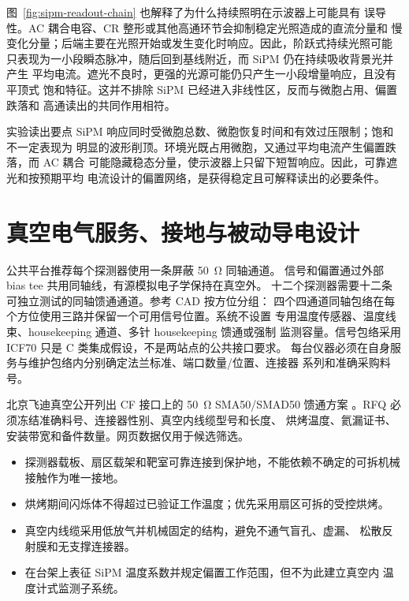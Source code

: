 \documentclass[UTF8,10pt,letterpaper,fontset=none]{ctexart}
\begin{document}
图~\ref{fig:sipm-readout-chain} 也解释了为什么持续照明在示波器上可能具有
误导性。AC 耦合电容、CR 整形或其他高通环节会抑制稳定光照造成的直流分量和
慢变化分量；后端主要在光照开始或发生变化时响应。因此，阶跃式持续光照可能
只表现为一小段瞬态脉冲，随后回到基线附近，而 SiPM 仍在持续吸收背景光并产生
平均电流。遮光不良时，更强的光源可能仍只产生一小段增量响应，且没有平顶式
饱和特征。这并不排除 SiPM 已经进入非线性区，反而与微胞占用、偏置跌落和
高通读出的共同作用相符。

\begin{notebox}{实验读出要点}
  SiPM 响应同时受微胞总数、微胞恢复时间和有效过压限制；饱和不一定表现为
  明显的波形削顶。环境光既占用微胞，又通过平均电流产生偏置跌落，而 AC 耦合
  可能隐藏稳态分量，使示波器上只留下短暂响应。因此，可靠遮光和按预期平均
  电流设计的偏置网络，是获得稳定且可解释读出的必要条件。
\end{notebox}

\section{真空电气服务、接地与被动导电设计}

公共平台推荐每个探测器使用一条屏蔽 \SI{50}{\ohm} 同轴通道。
信号和偏置通过外部 bias tee 共用同轴线，有源模拟电子学保持在真空外。
十二个探测器需要十二条可独立测试的同轴馈通通道。参考 CAD 按方位分组：
四个四通道同轴包络在每个方位使用三路并保留一个可用信号位置。系统不设置
专用温度传感器、温度线束、housekeeping 通道、多针 housekeeping 馈通或强制
监测容量。信号包络采用 ICF70 只是 C 类集成假设，不是两站点的公共接口要求。
每台仪器必须在自身服务与维护包络内分别确定法兰标准、端口数量/位置、连接器
系列和准确采购料号。

北京飞迪真空公开列出 CF 接口上的 \SI{50}{\ohm} SMA50/SMAD50 馈通方案
\cite{feedivac_sma}。RFQ 必须冻结准确料号、连接器性别、真空内线缆型号和长度、
烘烤温度、氦漏证书、安装带宽和备件数量。网页数据仅用于候选筛选。

\begin{itemize}
  \item 探测器载板、扇区载架和靶室可靠连接到保护地，不能依赖不确定的可拆机械
    接触作为唯一接地。
  \item 烘烤期间闪烁体不得超过已验证工作温度；优先采用扇区可拆的受控烘烤。
  \item 真空内线缆采用低放气并机械固定的结构，避免不通气盲孔、虚漏、
    松散反射膜和无支撑连接器。
  \item 在台架上表征 SiPM 温度系数并规定偏置工作范围，但不为此建立真空内
    温度计式监测子系统。
\end{itemize}
\end{document}
